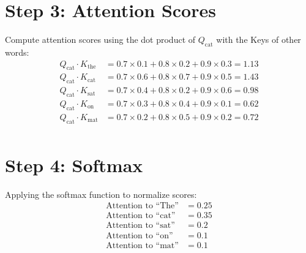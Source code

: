 \documentclass{article}
\begin{document}
\section*{Step 3: Attention Scores}
Compute attention scores using the dot product of \(Q_{\text{cat}}\) with the Keys of other words:
\[
\begin{aligned}
Q_{\text{cat}} \cdot K_{\text{the}} & = 0.7 \times 0.1 + 0.8 \times 0.2 + 0.9 \times 0.3 = 1.13 \\
Q_{\text{cat}} \cdot K_{\text{cat}} & = 0.7 \times 0.6 + 0.8 \times 0.7 + 0.9 \times 0.5 = 1.43 \\
Q_{\text{cat}} \cdot K_{\text{sat}} & = 0.7 \times 0.4 + 0.8 \times 0.2 + 0.9 \times 0.6 = 0.98 \\
Q_{\text{cat}} \cdot K_{\text{on}} & = 0.7 \times 0.3 + 0.8 \times 0.4 + 0.9 \times 0.1 = 0.62 \\
Q_{\text{cat}} \cdot K_{\text{mat}} & = 0.7 \times 0.2 + 0.8 \times 0.5 + 0.9 \times 0.2 = 0.72 \\
\end{aligned}
\]

\section*{Step 4: Softmax}
Applying the softmax function to normalize scores:
\[
\begin{aligned}
\text{Attention to ``The''} & = 0.25 \\
\text{Attention to ``cat''} & = 0.35 \\
\text{Attention to ``sat''} & = 0.2 \\
\text{Attention to ``on''} & = 0.1 \\
\text{Attention to ``mat''} & = 0.1 \\
\end{aligned}
\]
\end{document}

